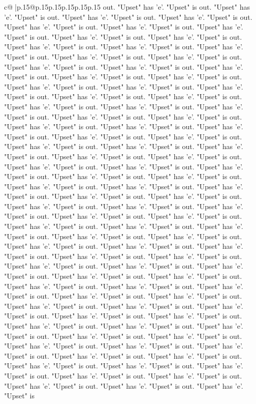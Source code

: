 \documentclass{article}
\begin{document}
{\begin{supertabular}{c@{$\;$}|p{.15\linewidth}@{}p{.15\linewidth}p{.15\linewidth}p{.15\linewidth}p{.15\linewidth}p{.15\linewidth}}
{{{out. "Upset" has 'e'. "Upset" is out. "Upset" has 'e'. "Upset" is out. "Upset" has 'e'. "Upset" is out. "Upset" has 'e'. "Upset" is out. "Upset" has 'e'. "Upset" is out. "Upset" has 'e'. "Upset" is out. "Upset" has 'e'. "Upset" is out. "Upset" has 'e'. "Upset" is out. "Upset" has 'e'. "Upset" is out. "Upset" has 'e'. "Upset" is out. "Upset" has 'e'. "Upset" is out. "Upset" has 'e'. "Upset" is out. "Upset" has 'e'. "Upset" is out. "Upset" has 'e'. "Upset" is out. "Upset" has 'e'. "Upset" is out. "Upset" has 'e'. "Upset" is out. "Upset" has 'e'. "Upset" is out. "Upset" has 'e'. "Upset" is out. "Upset" has 'e'. "Upset" is out. "Upset" has 'e'. "Upset" is out. "Upset" has 'e'. "Upset" is out. "Upset" has 'e'. "Upset" is out. "Upset" has 'e'. "Upset" is out. "Upset" has 'e'. "Upset" is out. "Upset" has 'e'. "Upset" is out. "Upset" has 'e'. "Upset" is out. "Upset" has 'e'. "Upset" is out. "Upset" has 'e'. "Upset" is out. "Upset" has 'e'. "Upset" is out. "Upset" has 'e'. "Upset" is out. "Upset" has 'e'. "Upset" is out. "Upset" has 'e'. "Upset" is out. "Upset" has 'e'. "Upset" is out. "Upset" has 'e'. "Upset" is out. "Upset" has 'e'. "Upset" is out. "Upset" has 'e'. "Upset" is out. "Upset" has 'e'. "Upset" is out. "Upset" has 'e'. "Upset" is out. "Upset" has 'e'. "Upset" is out. "Upset" has 'e'. "Upset" is out. "Upset" has 'e'. "Upset" is out. "Upset" has 'e'. "Upset" is out. "Upset" has 'e'. "Upset" is out. "Upset" has 'e'. "Upset" is out. "Upset" has 'e'. "Upset" is out. "Upset" has 'e'. "Upset" is out. "Upset" has 'e'. "Upset" is out. "Upset" has 'e'. "Upset" is out. "Upset" has 'e'. "Upset" is out. "Upset" has 'e'. "Upset" is out. "Upset" has 'e'. "Upset" is out. "Upset" has 'e'. "Upset" is out. "Upset" has 'e'. "Upset" is out. "Upset" has 'e'. "Upset" is out. "Upset" has 'e'. "Upset" is out. "Upset" has 'e'. "Upset" is out. "Upset" has 'e'. "Upset" is out. "Upset" has 'e'. "Upset" is out. "Upset" has 'e'. "Upset" is out. "Upset" has 'e'. "Upset" is out. "Upset" has 'e'. "Upset" is out. "Upset" has 'e'. "Upset" is out. "Upset" has 'e'. "Upset" is out. "Upset" has 'e'. "Upset" is out. "Upset" has 'e'. "Upset" is out. "Upset" has 'e'. "Upset" is out. "Upset" has 'e'. "Upset" is out. "Upset" has 'e'. "Upset" is out. "Upset" has 'e'. "Upset" is out. "Upset" has 'e'. "Upset" is out. "Upset" has 'e'. "Upset" is out. "Upset" has 'e'. "Upset" is out. "Upset" has 'e'. "Upset" is out. "Upset" has 'e'. "Upset" is out. "Upset" has 'e'. "Upset" is out. "Upset" has 'e'. "Upset" is out. "Upset" has 'e'. "Upset" is out. "Upset" has 'e'. "Upset" is out. "Upset" has 'e'. "Upset" is out. "Upset" has 'e'. "Upset" is out. "Upset" has 'e'. "Upset" is out. "Upset" has 'e'. "Upset" is out. "Upset" has 'e'. "Upset" is out. "Upset" has 'e'. "Upset" is out. "Upset" has 'e'. "Upset" is out. "Upset" has 'e'. "Upset" is out. "Upset" has 'e'. "Upset" is out. "Upset" has 'e'. "Upset" is out. "Upset" has 'e'. "Upset" is out. "Upset" has 'e'. "Upset" is out. "Upset" has 'e'. "Upset" is out. "Upset" has 'e'. "Upset" is out. "Upset" has 'e'. "Upset" is out. "Upset" has 'e'. "Upset" is out. "Upset" has 'e'. "Upset" is out. "Upset" has 'e'. "Upset" is out. "Upset" has 'e'. "Upset" is }}}
\end{supertabular}}
\end{document}
